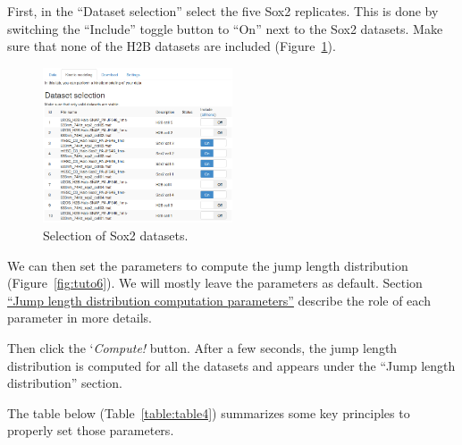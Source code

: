 First, in the ``Dataset selection'' select the five Sox2 replicates. This is done by switching the ``Include'' toggle button to ``On'' next to the Sox2 datasets. Make sure that none of the H2B datasets are included (Figure~\ref{fig:tuto5}).

\begin{figure}[h]
\centering
\includegraphics[width=0.5\textwidth]{../SPTGUI/static/SPTGUI/img/tutorial/0.7/tuto5.png}
\caption{\label{fig:tuto5}Selection of Sox2 datasets.}
\end{figure}

We can then set the parameters to compute the jump length distribution (Figure~\ref{fig:tuto6}). We will mostly leave the parameters as default. Section \href{https://spoton.berkeley.edu/SPTGUI/docs/latest#jld-parameters}{``Jump length distribution computation parameters''} describe the role of each parameter in more details.

Then click the `\textit{Compute!} button. After a few seconds, the jump length distribution is computed for all the datasets and appears under the ``Jump length distribution'' section.

The table below (Table~\ref{table:table4}) summarizes some key principles to properly set those parameters.

